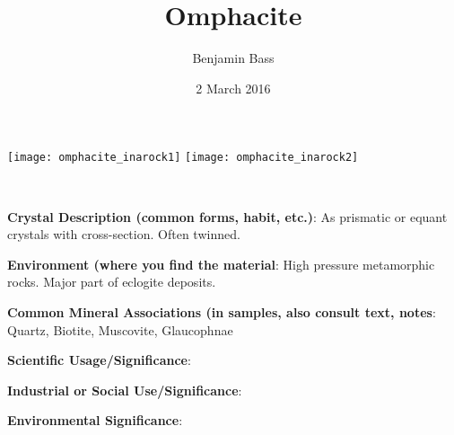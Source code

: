 \documentclass[10pt]{article}
\author{Benjamin Bass}
\date{2 March 2016}
\title{\vspace{-2.0cm}Omphacite} %
\begin{document}
\maketitle


\begin{center}
  \texttt{[image: omphacite\_inarock1]}
  \texttt{[image: omphacite\_inarock2]}
\end{center}



 \
\
\
\
\
\
\
\
\
\

\begin{framed}
  \textbf{Crystal Description (common forms, habit, etc.)}: As prismatic or equant crystals with cross-section. Often twinned.
\end{framed}

\begin{framed}
  \textbf{Environment (where you find the material}: High pressure metamorphic rocks. Major part of eclogite deposits.
\end{framed}

\begin{framed}
  \textbf{Common Mineral Associations (in samples, also consult text, notes}: Quartz, Biotite, Muscovite, Glaucophnae
\end{framed}

\begin{framed}
  \textbf{Scientific Usage/Significance}: 
\end{framed}

\begin{framed}
  \textbf{Industrial or Social Use/Significance}: 
\end{framed}

\begin{framed}
  \textbf{Environmental Significance}: 
\end{framed}

\end{document}
